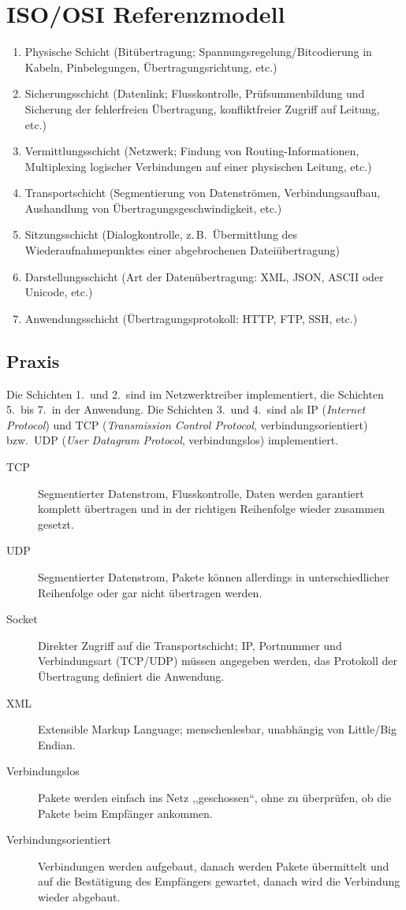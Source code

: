 \section{ISO/OSI Referenzmodell}
\begin{enumerate}
\item Physische Schicht (Bitübertragung; Spannungsregelung/Bitcodierung in Kabeln, Pinbelegungen, Übertragungsrichtung, etc.)
\item Sicherungsschicht (Datenlink; Flusskontrolle, Prüfsummenbildung und Sich\-er\-ung der fehlerfreien Übertragung, konfliktfreier Zugriff auf Leitung, etc.)
\item Vermittlungsschicht (Netzwerk; Findung von Routing-Informationen, Multiplexing logischer Verbindungen auf einer physischen Leitung, etc.)
\item Transportschicht (Segmentierung von Datenströmen, Verbindungsaufbau, Aushandlung von Übertragungsgeschwindigkeit, etc.)
\item Sitzungsschicht (Dialogkontrolle, z.\,B.~Übermittlung des Wiederaufnahmepunktes einer abgebrochenen Dateiübertragung)
\item Darstellungsschicht (Art der Datenübertragung: XML, JSON, ASCII oder Unicode, etc.)
\item Anwendungsschicht (Übertragungsprotokoll: HTTP, FTP, SSH, etc.)
\end{enumerate}

\subsection{Praxis}

Die Schichten 1.~und 2.~sind im Netzwerktreiber implementiert, die Schichten 5.~bis 7.~in der Anwendung.
Die Schichten 3.~und 4.~sind als IP (\emph{Internet Protocol}) und TCP (\emph{Transmission Control Protocol}, verbindungsorientiert) bzw.~UDP (\emph{User Datagram Protocol}, verbindungslos) implementiert.
\begin{description}
\item [{TCP}] Segmentierter Datenstrom, Flusskontrolle, Daten werden garantiert komplett übertragen und in der richtigen Reihenfolge wieder zusammen gesetzt.
\item [{UDP}] Segmentierter Datenstrom, Pakete können allerdings in unterschiedlicher Reihenfolge oder gar nicht übertragen werden.
\item [{Socket}] Direkter Zugriff auf die Transportschicht; IP, Portnummer und Verbindungsart (TCP/UDP) müssen angegeben werden, das Protokoll der Übertragung definiert die Anwendung.
\item [{XML}] Extensible Markup Language; menschenlesbar, unabhängig von Little/Big Endian.
\item [{Verbindungslos}] Pakete werden einfach ins Netz ,,geschossen``, ohne zu überprüfen, ob die Pakete beim Empfänger ankommen.
\item [{Verbindungsorientiert}] Verbindungen werden aufgebaut, danach werden Pakete übermittelt und auf die Bestätigung des Empfängers gewartet, danach wird die Verbindung wieder abgebaut.
\end{description}


